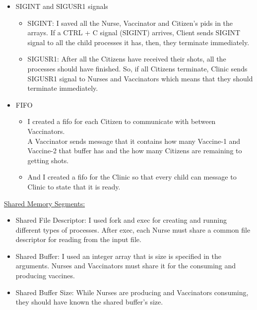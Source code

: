 \documentclass[12pt]{report}
\renewcommand{\_}{\kern-1.5pt\textunderscore\kern-1.5pt}
\begin{document}
\begin{itemize}
\begin{itemize}
\vspace{\baselineskip}

\end{itemize}
	\item SIGINT and SIGUSR1 signals
\begin{itemize}
	\item SIGINT: I saved all the Nurse, Vaccinator and Citizen’s pids in the arrays. If a CTRL + C signal (SIGINT) arrives, Client sends SIGINT signal to all the child processes it has, then, they terminate immediately. 
	\item SIGUSR1: After all the Citizens have received their shots, all the processes should have finished. So, if all Citizens terminate, Clinic sends SIGUSR1 signal to Nurses and Vaccinators which means that they should terminate immediately.
\begin{justify}
 
\end{justify}

\end{itemize}
	\item FIFO
\begin{itemize}
	\item I created a fifo for each Citizen to communicate with between Vaccinators. \\
A Vaccinator sends message that it contains how many Vaccine-1 and Vaccine-2 that buffer has and the how many Citizens are remaining to getting shots.
	\item And I created a fifo for the Clinic so that every child can message to Clinic to state that it is ready.
\end{itemize}
\end{itemize}

\vspace{\baselineskip}
\begin{justify}
{\fontsize{14pt}{16.8pt}\selectfont \uline{Shared Memory Segments:}}
\end{justify}
\begin{itemize}
	\item Shared File Descriptor: I used fork and exec for creating and running different types of processes. After exec, each Nurse must share a common file descriptor for reading from the input file.

\vspace{\baselineskip}
	\item Shared Buffer: I used an integer array that is size is specified in the arguments. Nurses and Vaccinators must share it for the consuming and producing vaccines.

\vspace{\baselineskip}
	\item Shared Buffer Size: While Nurses are producing and Vaccinators consuming, they should have known the shared buffer’s size.
\end{itemize}
\end{document}
